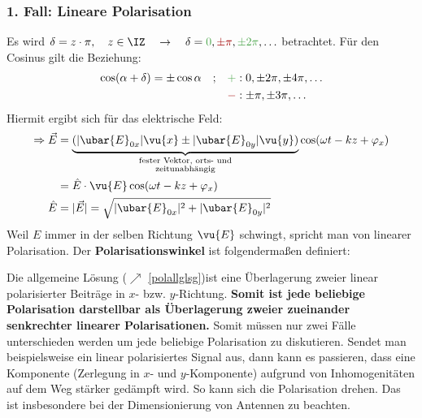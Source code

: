   \subsubsection{1. Fall: Lineare Polarisation}
		  Es wird \(\delta = z \cdot \pi ,\quad z \in \IZ\quad\rightarrow\quad \delta = \textcolor{green!70}{0}, \textcolor{red}{\pm \pi} , \textcolor{green!70}{\pm 2\pi}, \ldots\) betrachtet. Für den Cosinus gilt die Beziehung:
		        \begin{equation}\begin{split}
				        \begin{split}
					        \cos ( \alpha + \delta ) = \pm \cos \alpha \quad;\quad &\textcolor{green!70}{+} :   0,\pm 2\pi, \pm 4\pi, \ldots\\
					        & \textcolor{red}{-} :   \pm \pi, \pm 3\pi, \ldots
				        \end{split}
			        \end{split}\end{equation}
		   Hiermit ergibt sich für das elektrische Feld:
		        \begin{equation}\begin{split}
				        \Rightarrow \vec{E}&= \underbrace{(\vert \ubar{E}_{0x} \vert \vu{x} \pm \vert \ubar{E}_{0y}\vert \vu{y})}_{\substack{\text{fester Vektor, orts- und}\\ \text{zeitunabhängig}}} \cos (\omega t -  k z + \varphi_x)\\
				        &= \hat{E}\cdot \vu{E}\cos (\omega t -  k z + \varphi_x )\\
				        \hat{E} &= \vert \vec{E} \vert = \sqrt{\vert \ubar{E}_{0x} \vert ^2 + \vert \ubar{E}_{0y} \vert ^2}
			        \end{split}\end{equation}
		  Weil $E$ immer in der selben Richtung $\vu{E}$ schwingt, spricht man von linearer Polarisation. Der \textbf{Polarisationswinkel} ist folgendermaßen definiert:
	  \begin{center}
		  
	  \end{center}
	  Die allgemeine Lösung ($\nearrow$ \ref{polallglsg})ist eine Überlagerung zweier linear polarisierter Beiträge in \(x\)- bzw. \(y\)-Richtung. \textbf{Somit ist jede beliebige Polarisation darstellbar als Überlagerung zweier zueinander senkrechter linearer Polarisationen.} Somit müssen nur zwei Fälle unterschieden werden um jede beliebige Polarisation zu diskutieren. Sendet man beispielsweise ein linear polarisiertes Signal aus, dann kann es passieren, dass eine Komponente (Zerlegung in $x$- und $y$-Komponente) aufgrund von Inhomogenitäten auf dem Weg stärker gedämpft wird. So kann sich die Polarisation drehen. Das ist insbesondere bei der Dimensionierung von Antennen zu beachten.
